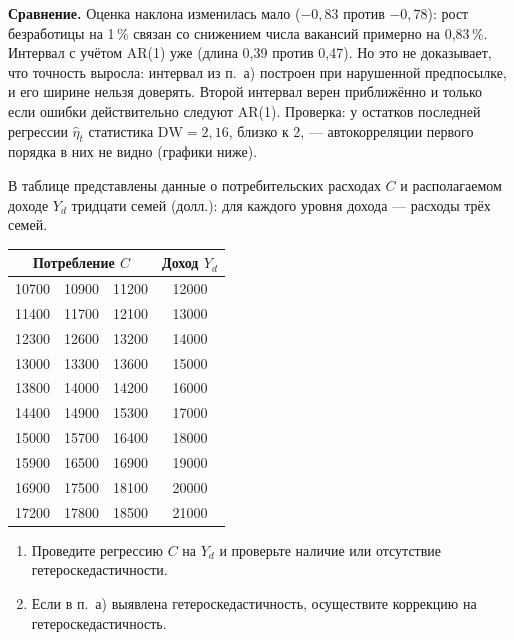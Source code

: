 \begin{solution}
\medskip
\noindent\begin{minipage}{\linewidth}
\textbf{Сравнение.}
\intervalvisual
Оценка наклона изменилась мало ($-0{,}83$ против $-0{,}78$): рост
безработицы на 1\,\% связан со снижением числа вакансий примерно на
0,83\,\%. Интервал с учётом AR(1) уже (длина 0,39 против 0,47). Но это не
доказывает, что точность выросла: интервал из п.~а) построен при нарушенной
предпосылке, и его ширине нельзя доверять. Второй интервал верен
приближённо и только если ошибки действительно следуют AR(1). Проверка:
у остатков последней регрессии $\widehat\eta_t$ статистика
$\mathrm{DW} = 2{,}16$, близко к 2, — автокорреляции первого порядка в них
не видно (графики ниже).
\end{minipage}
\arresidualvisual
\end{solution}

\ifsolutions\clearpage\fi
{}

В таблице представлены данные о потребительских расходах $C$ и располагаемом
доходе $Y_d$ тридцати семей (долл.): для каждого уровня дохода — расходы
трёх семей.
\begin{center}
\begin{tabular}{ccc|c}
\toprule
\multicolumn{3}{c|}{Потребление $C$} & Доход $Y_d$ \\
\midrule
10700 & 10900 & 11200 & 12000 \\
11400 & 11700 & 12100 & 13000 \\
12300 & 12600 & 13200 & 14000 \\
13000 & 13300 & 13600 & 15000 \\
13800 & 14000 & 14200 & 16000 \\
14400 & 14900 & 15300 & 17000 \\
15000 & 15700 & 16400 & 18000 \\
15900 & 16500 & 16900 & 19000 \\
16900 & 17500 & 18100 & 20000 \\
17200 & 17800 & 18500 & 21000 \\
\bottomrule
\end{tabular}
\end{center}
\begin{enumerate}[label=\asbuk*), leftmargin=2.2em, itemsep=3pt]
  \item Проведите регрессию $C$ на $Y_d$ и проверьте наличие или отсутствие
        гетероскедастичности.
  \item Если в п.~а) выявлена гетероскедастичность, осуществите коррекцию на
        гетероскедастичность.
\end{enumerate}

